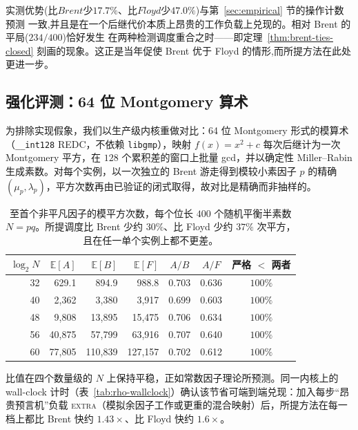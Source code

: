 \documentclass[11pt]{ctexart}
\begin{document}
实测优势($比 Brent 少 17.7\%、比 Floyd 少 47.0\%$)与第~\ref{sec:empirical} 节的操作计数预测
一致,并且是在一个后继代价本质上昂贵的工作负载上兑现的。相对 Brent 的平局($234/400$)恰好发生
在两种检测调度重合之时——即定理~\ref{thm:brent-ties-closed} 刻画的现象。这正是当年促使 Brent
优于 Floyd 的情形,而所提方法在此处更进一步。

\subsection{强化评测：64 位 Montgomery 算术}
\label{sec:rho-hardened}

为排除实现假象，我们以生产级内核重做对比：64 位 Montgomery 形式的模算术（\texttt{\_\_int128} REDC，不依赖 \texttt{libgmp}），映射 $f(x)=x^2+c$ 每次后继计为一次 Montgomery 平方，在 $128$ 个累积差的窗口上批量 gcd，并以确定性 Miller--Rabin 生成素数。对每个实例，以一次独立的 Brent 游走得到模较小素因子 $p$ 的精确 $(\mu_p,\lambda_p)$，平方次数再由已验证的闭式取得，故对比是精确而非抽样的。

\begin{table}[H]\centering
\caption{至首个非平凡因子的模平方次数，每个位长 $400$ 个随机平衡半素数 $N=pq$。所提调度比 Brent 少约 $30\%$、比 Floyd 少约 $37\%$ 次平方，且在任一单个实例上都不更差。}
\label{tab:rho-hardened}
\begin{tabular}{rrrrccc}
\toprule
$\log_2 N$ & $\mathbb E[A]$ & $\mathbb E[B]$ & $\mathbb E[F]$ & $A/B$ & $A/F$ & 严格 $<$ 两者\\
\midrule
32 & 629.1 & 894.9 & 988.8 & 0.703 & 0.636 & $100\%$\\
40 & 2{,}362 & 3{,}380 & 3{,}917 & 0.699 & 0.603 & $100\%$\\
48 & 9{,}808 & 13{,}895 & 15{,}475 & 0.706 & 0.634 & $100\%$\\
56 & 40{,}875 & 57{,}799 & 63{,}916 & 0.707 & 0.640 & $100\%$\\
60 & 77{,}805 & 110{,}839 & 127{,}157 & 0.702 & 0.612 & $100\%$\\
\bottomrule
\end{tabular}
\end{table}

比值在四个数量级的 $N$ 上保持平稳，正如常数因子理论所预测。同一内核上的 wall-clock 计时（表~\ref{tab:rho-wallclock}）确认该节省可端到端兑现：加入每步``昂贵预言机''负载 \textsc{extra}（模拟余因子工作或更重的混合映射）后，所提方法在每一档上都比 Brent 快约 $1.43\times$、比 Floyd 快约 $1.6\times$。
\end{document}

